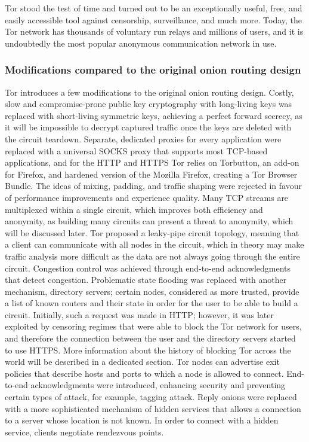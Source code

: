Tor stood the test of time and turned out to be an exceptionally useful, free, and easily accessible tool against censorship, surveillance, and much more. Today, the Tor network has thousands of voluntary run relays and millions of users, and it is undoubtedly the most popular anonymous communication network in use.

\subsubsection{Modifications compared to the original onion routing design}
Tor introduces a few modifications to the original onion routing design.
Costly, slow and compromise-prone public key cryptography with long-living keys was replaced with short-living symmetric keys, achieving a perfect forward secrecy, as it will be impossible to decrypt captured traffic once the keys are deleted with the circuit teardown. Separate, dedicated proxies for every application were replaced with a universal SOCKS proxy that supports most TCP-based applications, and for the HTTP and HTTPS Tor relies on Torbutton, an add-on for Firefox, and hardened version of the Mozilla Firefox, creating a Tor Browser Bundle. The ideas of mixing, padding, and traffic shaping were rejected in favour of performance improvements and experience quality. Many TCP streams are multiplexed within a single circuit, which improves both efficiency and anonymity, as building many circuits can present a threat to anonymity, which will be discussed later. Tor proposed a leaky-pipe circuit topology, meaning that a client can communicate with all nodes in the circuit, which in theory may make traffic analysis more difficult as the data are not always going through the entire circuit. Congestion control was achieved through end-to-end acknowledgments that detect congestion. Problematic state flooding was replaced with another mechanism, directory servers; certain nodes, considered as more trusted, provide a list of known routers and their state in order for the user to be able to build a circuit. Initially, such a request was made in HTTP; however, it was later exploited by censoring regimes that were able to block the Tor network for users, and therefore the connection between the user and the directory servers started to use HTTPS. More information about the history of blocking Tor across the world will be described in a dedicated section. 
Tor nodes can advertise exit policies that describe hosts and ports to which a node is allowed to connect. End-to-end acknowledgments were introduced, enhancing security and preventing certain types of attack, for example, tagging attack. Reply onions were replaced with a more sophisticated mechanism of hidden services that allows a connection to a server whose location is not known. In order to connect with a hidden service, clients negotiate rendezvous points.

